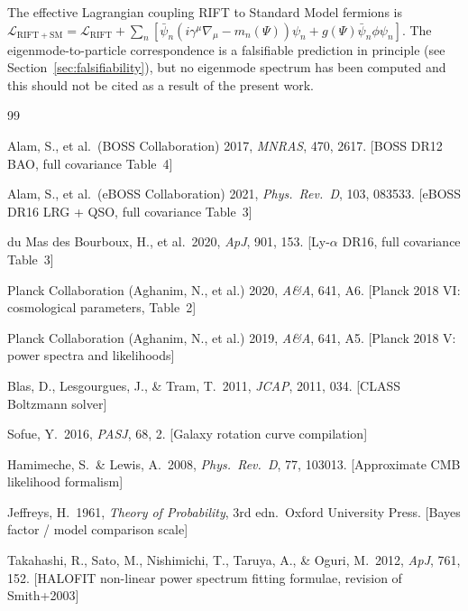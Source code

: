 \documentclass[12pt,a4paper]{article}
\begin{document}
The effective Lagrangian coupling RIFT to Standard Model fermions is
$\mathcal{L}_{\mathrm{RIFT+SM}} = \mathcal{L}_{\mathrm{RIFT}} + \sum_n[\bar\psi_n(i\gamma^\mu\nabla_\mu - m_n(\Psi))\psi_n + g(\Psi)\bar\psi_n\phi\psi_n]$.
The eigenmode-to-particle correspondence is a falsifiable prediction in principle
(see Section~\ref{sec:falsifiability}), but no eigenmode spectrum has been
computed and this should not be cited as a result of the present work.


\begin{thebibliography}{99}

Alam, S., et al.\ (BOSS Collaboration) 2017,
\textit{MNRAS}, 470, 2617.
[BOSS DR12 BAO, full covariance Table~4]

Alam, S., et al.\ (eBOSS Collaboration) 2021,
\textit{Phys.\ Rev.\ D}, 103, 083533.
[eBOSS DR16 LRG + QSO, full covariance Table~3]

du Mas des Bourboux, H., et al.\ 2020,
\textit{ApJ}, 901, 153.
[Ly-$\alpha$ DR16, full covariance Table~3]

Planck Collaboration (Aghanim, N., et al.) 2020,
\textit{A\&A}, 641, A6.
[Planck 2018 VI: cosmological parameters, Table~2]

Planck Collaboration (Aghanim, N., et al.) 2019,
\textit{A\&A}, 641, A5.
[Planck 2018 V: power spectra and likelihoods]

Blas, D., Lesgourgues, J., \& Tram, T.\ 2011,
\textit{JCAP}, 2011, 034.
[CLASS Boltzmann solver]

Sofue, Y.\ 2016, \textit{PASJ}, 68, 2.
[Galaxy rotation curve compilation]

Hamimeche, S.\ \& Lewis, A.\ 2008,
\textit{Phys.\ Rev.\ D}, 77, 103013.
[Approximate CMB likelihood formalism]

Jeffreys, H.\ 1961,
\textit{Theory of Probability}, 3rd edn.\ Oxford University Press.
[Bayes factor / model comparison scale]

Takahashi, R., Sato, M., Nishimichi, T., Taruya, A., \& Oguri, M.\ 2012,
\textit{ApJ}, 761, 152.
[HALOFIT non-linear power spectrum fitting formulae, revision of Smith+2003]


\end{thebibliography}
\end{document}
